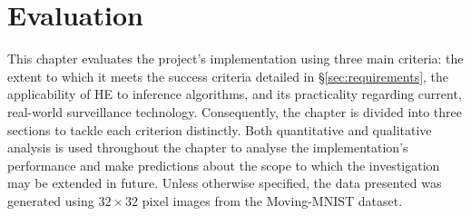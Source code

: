 \chapter{Evaluation}
\label{chap:evaluation}

\indent \indent
This chapter evaluates the project's implementation using three main criteria: the extent to which it meets the success criteria detailed in §\ref{sec:requirements},  the applicability of HE to inference algorithms, and its practicality regarding current, real-world surveillance technology. Consequently, the chapter is divided into three sections to tackle each criterion distinctly. Both quantitative and qualitative analysis is used throughout the chapter to analyse the implementation's performance and make predictions about the scope to which the investigation may be extended in future. Unless otherwise specified, the data presented was generated using $32 \times 32$ pixel images from the Moving-MNIST dataset.

